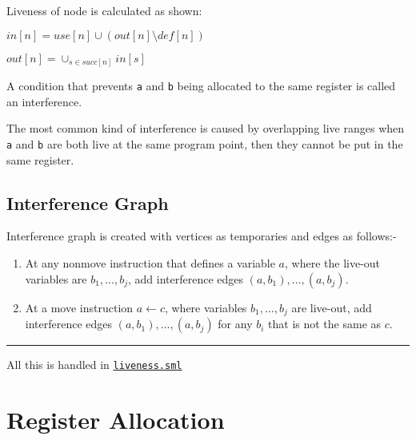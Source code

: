 Liveness of node is calculated as shown:

\(in[n] = use[n] \cup (out[n] \setminus def[n])\)

\(out[n] = \cup_{s \in succ[n]} in[s]\)

A condition that prevents
\texttt{a} and
\texttt{b} being
allocated to the same register is called an interference.

The most common kind of interference is caused by overlapping live
ranges when
\texttt{a} and
\texttt{b} are
both live at the same program point, then they cannot be put in the same
register.

\hypertarget{interference-graph}{%
\subsection{Interference Graph}\label{interference-graph}}

Interference graph is created with vertices as temporaries and edges as
follows:-

\begin{enumerate}
\def\labelenumi{\arabic{enumi}.}
\item
  At any nonmove instruction that defines a variable \(a\), where the
  live-out variables are \(b_1, \dots, b_j\), add interference edges
  \((a, b_1), \dots, (a, b_j)\).
\item
  At a move instruction \(a \leftarrow c\), where variables
  \(b_1, \dots, b_j\) are live-out, add interference edges
  \((a, b_1), \dots, (a, b_j)\) for any \(b_i\) that is not the same as
  \(c\).
\end{enumerate}

\begin{center}\rule{0.5\linewidth}{\linethickness}\end{center}

All this is handled in
\href{https://www.github.com/sourabh2311/btp/tree/master/Compiler/liveness.sml}{\texttt{liveness.sml}}

\section{Register Allocation}


